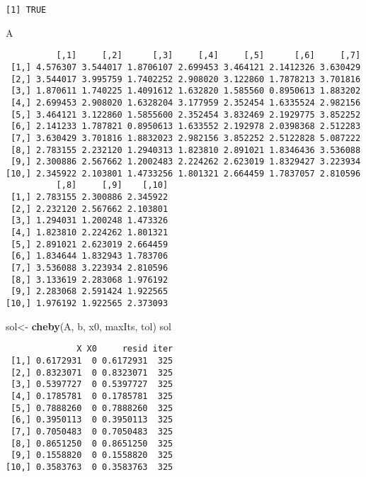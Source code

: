 \documentclass[]{article}
\newenvironment{Shaded}{\begin{snugshade}}{\end{snugshade}}
\newcommand{\KeywordTok}[1]{\textcolor[rgb]{0.13,0.29,0.53}{\textbf{#1}}}
\newcommand{\StringTok}[1]{\textcolor[rgb]{0.31,0.60,0.02}{#1}}
\newcommand{\NormalTok}[1]{#1}
\begin{document}
\begin{verbatim}
[1] TRUE
\end{verbatim}

\begin{Shaded}
\begin{Highlighting}[]
\NormalTok{A}
\end{Highlighting}
\end{Shaded}

\begin{verbatim}
          [,1]     [,2]      [,3]     [,4]     [,5]      [,6]     [,7]
 [1,] 4.576307 3.544017 1.8706107 2.699453 3.464121 2.1412326 3.630429
 [2,] 3.544017 3.995759 1.7402252 2.908020 3.122860 1.7878213 3.701816
 [3,] 1.870611 1.740225 1.4091612 1.632820 1.585560 0.8950613 1.883202
 [4,] 2.699453 2.908020 1.6328204 3.177959 2.352454 1.6335524 2.982156
 [5,] 3.464121 3.122860 1.5855600 2.352454 3.832469 2.1929775 3.852252
 [6,] 2.141233 1.787821 0.8950613 1.633552 2.192978 2.0398368 2.512283
 [7,] 3.630429 3.701816 1.8832023 2.982156 3.852252 2.5122828 5.087222
 [8,] 2.783155 2.232120 1.2940313 1.823810 2.891021 1.8346436 3.536088
 [9,] 2.300886 2.567662 1.2002483 2.224262 2.623019 1.8329427 3.223934
[10,] 2.345922 2.103801 1.4733256 1.801321 2.664459 1.7837057 2.810596
          [,8]     [,9]    [,10]
 [1,] 2.783155 2.300886 2.345922
 [2,] 2.232120 2.567662 2.103801
 [3,] 1.294031 1.200248 1.473326
 [4,] 1.823810 2.224262 1.801321
 [5,] 2.891021 2.623019 2.664459
 [6,] 1.834644 1.832943 1.783706
 [7,] 3.536088 3.223934 2.810596
 [8,] 3.133619 2.283068 1.976192
 [9,] 2.283068 2.591424 1.922565
[10,] 1.976192 1.922565 2.373093
\end{verbatim}

\begin{Shaded}
\begin{Highlighting}[]
\NormalTok{sol<-}\StringTok{ }\KeywordTok{cheby}\NormalTok{(A, b, x0, maxIts, tol)}
\NormalTok{sol}
\end{Highlighting}
\end{Shaded}

\begin{verbatim}
              X X0     resid iter
 [1,] 0.6172931  0 0.6172931  325
 [2,] 0.8323071  0 0.8323071  325
 [3,] 0.5397727  0 0.5397727  325
 [4,] 0.1785781  0 0.1785781  325
 [5,] 0.7888260  0 0.7888260  325
 [6,] 0.3950113  0 0.3950113  325
 [7,] 0.7050483  0 0.7050483  325
 [8,] 0.8651250  0 0.8651250  325
 [9,] 0.1558820  0 0.1558820  325
[10,] 0.3583763  0 0.3583763  325
\end{verbatim}
\end{document}
